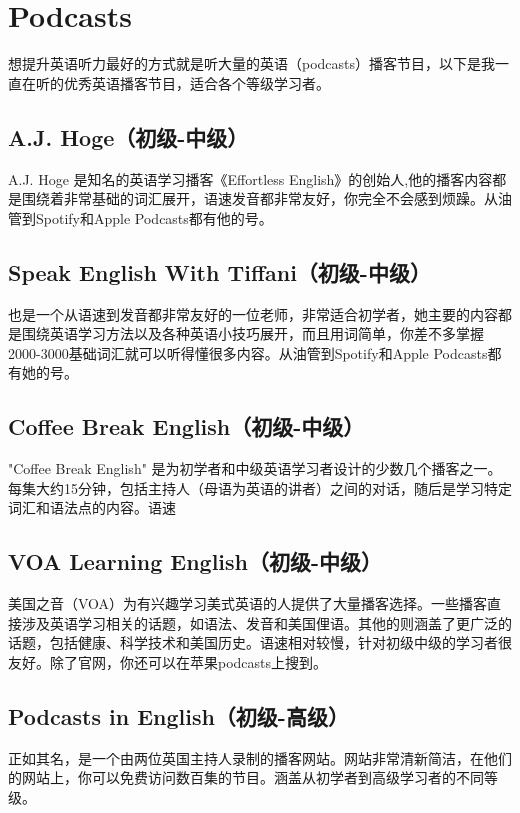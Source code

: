\documentclass[11pt]{article}
\begin{document}
\section{Podcasts}
\label{sec:org191ed76}
想提升英语听力最好的方式就是听大量的英语（podcasts）播客节目，以下是我一直在听的优秀英语播客节目，适合各个等级学习者。

\subsection{A.J. Hoge（初级-中级）}
\label{sec:orgc82f418}
A.J. Hoge 是知名的英语学习播客《Effortless English》的创始人,他的播客内容都是围绕着非常基础的词汇展开，语速发音都非常友好，你完全不会感到烦躁。从油管到Spotify和Apple Podcasts都有他的号。
\subsection{Speak English With Tiffani（初级-中级）}
\label{sec:org1fc20cc}
也是一个从语速到发音都非常友好的一位老师，非常适合初学者，她主要的内容都是围绕英语学习方法以及各种英语小技巧展开，而且用词简单，你差不多掌握2000-3000基础词汇就可以听得懂很多内容。从油管到Spotify和Apple Podcasts都有她的号。

\subsection{Coffee Break English（初级-中级）}
\label{sec:org3705bb9}
"Coffee Break English" 是为初学者和中级英语学习者设计的少数几个播客之一。每集大约15分钟，包括主持人（母语为英语的讲者）之间的对话，随后是学习特定词汇和语法点的内容。语速

\subsection{VOA Learning English（初级-中级）}
\label{sec:orga231f3e}
美国之音（VOA）为有兴趣学习美式英语的人提供了大量播客选择。一些播客直接涉及英语学习相关的话题，如语法、发音和美国俚语。其他的则涵盖了更广泛的话题，包括健康、科学技术和美国历史。语速相对较慢，针对初级中级的学习者很友好。除了官网，你还可以在苹果podcasts上搜到。
\subsection{Podcasts in English（初级-高级）}
\label{sec:orgf698497}
正如其名，是一个由两位英国主持人录制的播客网站。网站非常清新简洁，在他们的网站上，你可以免费访问数百集的节目。涵盖从初学者到高级学习者的不同等级。
\end{document}
